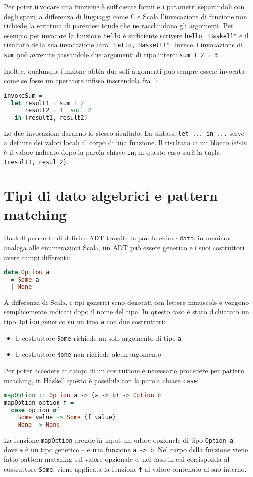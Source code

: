 Per poter invocare una funzione è sufficiente fornirle i parametri separandoli con degli spazi; a differenza di linguaggi come C e Scala l'invocazione di funzione non richiede la scrittura di parentesi tonde che ne racchiudano gli argomenti. Per esempio per invocare la funzione \lstinline{hello} è sufficiente scrivere \lstinline{hello "Haskell"} e il risultato della sua invocazione sarà \lstinline{"Hello, Haskell!"}.
Invece, l'invocazione di \lstinline{sum} può avvenire passandole due argomenti di tipo intero: \lstinline{sum 1 2 = 3}.

Inoltre, qualunque funzione abbia due soli argomenti può sempre essere invocata come se fosse un operatore infisso inserendola fra \lstinline{`}:
\begin{lstlisting}[language=haskell]
invokeSum =
  let result1 = sum 1 2
      result2 = 1 `sum` 2
   in (result1, result2)
\end{lstlisting}
Le due invocazioni daranno lo stesso risultato. La sintassi \lstinline{let ... in ...} serve a definire dei valori locali al corpo di una funzione.
Il risultato di un blocco \emph{let-in} è il valore indicato dopo la parola chiave \lstinline{in}; in questo caso sarà la tupla \lstinline{(result1, result2)}.

\section{Tipi di dato algebrici e pattern matching}
Haskell permette di definire \ac{ADT} tramite la parola chiave \lstinline{data}; in maniera analoga alle enumerazioni Scala, un ADT può essere generico e i suoi costruttori avere campi differenti:
\begin{lstlisting}[language=haskell]
data Option a
  = Some a
  | None
\end{lstlisting}
A differenza di Scala, i tipi generici sono denotati con lettere minuscole e vengono semplicemente indicati dopo il nome del tipo. In questo caso è stato dichiarato un tipo \lstinline{Option} generico su un tipo \lstinline{a} con due costruttori:
\begin{itemize}
  \item Il costruttore \lstinline{Some} richiede un solo argomento di tipo \lstinline{a}
  \item Il costruttore \lstinline{None} non richiede alcun argomento
\end{itemize}

Per poter accedere ai campi di un costruttore è necessario procedere per pattern matching, in Haskell questo è possibile con la parola chiave \lstinline{case}:
\begin{lstlisting}[language=haskell]
mapOption :: Option a -> (a -> b) -> Option b
mapOption option f =
  case option of
    Some value -> Some (f value)
    None -> None 
\end{lstlisting}
La funzione \lstinline{mapOption} prende in input un valore opzionale di tipo \lstinline{Option a} -- dove \lstinline{a} è un tipo generico -- e una funzione \lstinline{a -> b}. Nel corpo della funzione viene fatto pattern matching sul valore opzionale e, nel caso in cui corrisponda al costruttore \lstinline{Some}, viene applicata la funzione \lstinline{f} al valore contenuto al suo interno.

